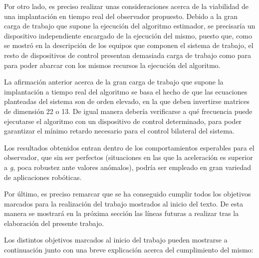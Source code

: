 Por otro lado, es preciso realizar unas consideraciones acerca de la viabilidad de una implantación en tiempo real del observador propuesto. Debido a la gran carga de trabajo que supone la ejecución del algoritmo estimador, se precisaría un dispositivo independiente encargado de la ejecución del mismo, puesto que, como se mostró en la descripción de los equipos que componen el sistema de trabajo, el resto de dispositivos de control presentan demasiada carga de trabajo como para para poder abarcar con los mismos recursos la ejecución del algoritmo. \par 

La afirmación anterior acerca de la gran carga de trabajo que supone la implantación a tiempo real del algoritmo se basa el hecho de que las ecuaciones planteadas del sistema son de orden elevado, en la que deben invertirse matrices de dimensión 22 o 13. De igual manera debería verificarse a qué frecuencia puede ejecutarse el algoritmo con un dispositivo de control determinado, para poder garantizar el mínimo retardo necesario para el control bilateral del sistema. \par 

Los resultados obtenidos entran dentro de los comportamientos esperables para el observador, que sin ser perfectos (situaciones en las que la aceleración es superior a \emph{g}, poca robustez ante valores anómalos), podría ser empleado en gran variedad de aplicaciones robóticas. \par 

Por último, es preciso remarcar que se ha conseguido cumplir todos los objetivos marcados para la realización del trabajo mostrados al inicio del texto. De esta manera se mostrará en la próxima sección las líneas futuras a realizar tras la elaboración del presente trabajo. \par 

Los distintos objetivos marcados al inicio del trabajo pueden mostrarse a continuación junto con una breve explicación acerca del cumplimiento del mismo:

